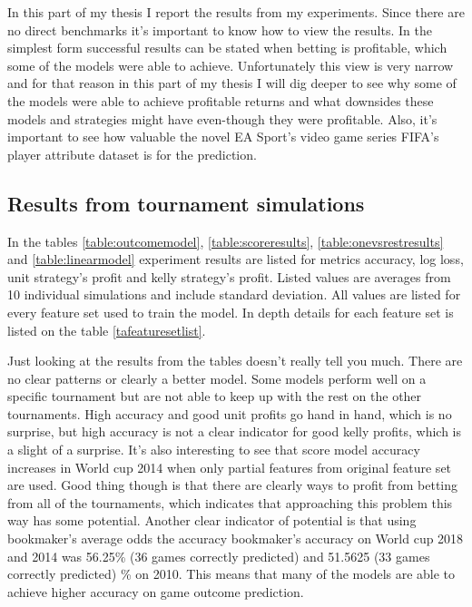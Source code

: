 In this part of my thesis I report the results from my experiments. Since there are no direct benchmarks it's important to know how to view the results. In the simplest form successful results can be stated when betting is profitable, which some of the models were able to achieve. Unfortunately this view is very narrow and for that reason in this part of my thesis I will dig deeper to see why some of the models were able to achieve profitable returns and what downsides these models and strategies might have even-though they were profitable. Also, it's important to see how valuable the novel EA Sport's video game series FIFA's player attribute dataset is for the prediction.

\subsection{Results from tournament simulations}
In the tables \ref{table:outcomemodel}, \ref{table:scoreresults}, \ref{table:onevsrestresults} and \ref{table:linearmodel} experiment results are listed for metrics accuracy, log loss, unit strategy's profit and kelly strategy's profit. Listed values are averages from 10 individual simulations and include standard deviation. All values are listed for every feature set used to train the model. In depth details for each feature set is listed on the table \ref{tafeaturesetlist}.

Just looking at the results from the tables doesn't really tell you much. There are no clear patterns or clearly a better model. Some models perform well on a specific tournament but are not able to keep up with the rest on the other tournaments. High accuracy and good unit profits go hand in hand, which is no surprise, but high accuracy is not a clear indicator for good kelly profits, which is a slight of a surprise. It's also interesting to see that score model accuracy increases in World cup 2014 when only partial features from original feature set are used. Good thing though is that there are clearly ways to profit from betting from all of the tournaments, which indicates that approaching this problem this way has some potential. Another clear indicator of potential is that using bookmaker's average odds the accuracy bookmaker's accuracy on World cup 2018 and 2014 was 56.25\% (36 games correctly predicted) and 51.5625 (33 games correctly predicted) \% on 2010. This means that many of the models are able to achieve higher accuracy on game outcome prediction.

